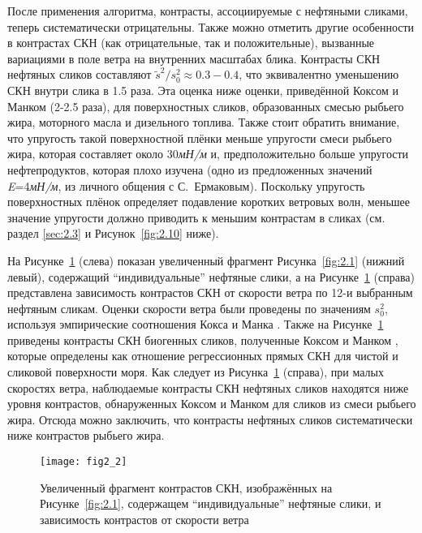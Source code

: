 После применения алгоритма, контрасты, ассоциируемые с нефтяными сликами, теперь систематически отрицательны. Также можно отметить другие особенности в контрастах СКН (как отрицательные, так и положительные), вызванные вариациями в поле ветра на внутренних масштабах блика. Контрасты СКН нефтяных сликов составляют $\tilde{s}^{2} /s_{0}^{2} \approx 0.3-0.4$, что эквивалентно уменьшению СКН внутри слика в 1.5 раза. Эта оценка ниже оценки, приведённой Коксом и Манком \citep{Cox1954a} (2-2.5 раза), для поверхностных сликов, образованных смесью рыбьего жира, моторного масла и дизельного топлива. Также стоит обратить внимание, что упругость такой поверхностной плёнки меньше упругости смеси рыбьего жира, которая составляет около 30\textit{мН/м} и, предположительно больше упругости нефтепродуктов, которая плохо изучена (одно из предложенных значений \textit{E}=4\textit{мН/м}, из личного общения с С.~Ермаковым). Поскольку упругость поверхностных плёнок определяет подавление коротких ветровых волн, меньшее значение упругости должно приводить к меньшим контрастам в сликах (см. раздел \ref{sec:2.3} и Рисунок~\ref{fig:2.10} ниже).

На Рисунке~\ref{fig:2.2} (слева) показан увеличенный фрагмент Рисунка~\ref{fig:2.1} (нижний левый), содержащий ``индивидуальные'' нефтяные слики, а на Рисунке~\ref{fig:2.2} (справа) представлена зависимость контрастов СКН от скорости ветра по 12-и выбранным нефтяным сликам. Оценки скорости ветра были проведены по значениям $s_{0}^{2} $, используя эмпирические соотношения Кокса и Манка \citep{Cox1954, Cox1954a}. Также на Рисунке~\ref{fig:2.2} приведены контрасты СКН биогенных сликов, полученные Коксом и Манком \citep{Cox1954a}, которые определены как отношение регрессионных прямых СКН для чистой и сликовой поверхности моря. Как следует из Рисунка~\ref{fig:2.2} (справа), при малых скоростях ветра, наблюдаемые контрасты СКН нефтяных сликов находятся ниже уровня контрастов, обнаруженных Коксом и Манком \citep{Cox1954, Cox1954a} для сликов из смеси рыбьего жира. Отсюда можно заключить, что контрасты нефтяных сликов систематически ниже контрастов рыбьего жира.



\begin{figure}[!thb]
 \texttt{[image: fig2\_2]}
 \caption{Увеличенный фрагмент контрастов СКН, изображённых на Рисунке~\ref{fig:2.1}, содержащем ``индивидуальные'' нефтяные слики, и зависимость контрастов от скорости ветра}
 \label{fig:2.2}
\end{figure}


